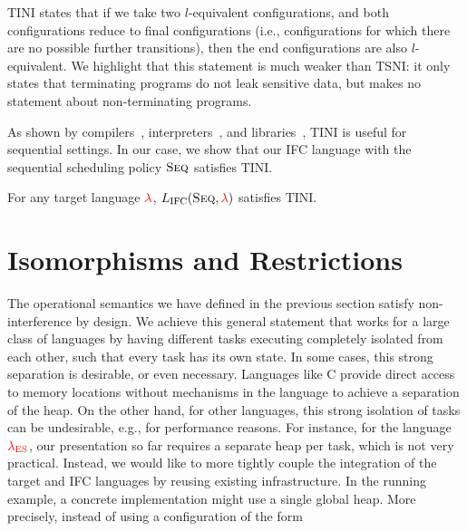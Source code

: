 \documentclass{llncs}
\newcommand{\Red}[1]{{\color{red} #1}}
\begin{document}
TINI states that if we take two \ensuremath{l}-equivalent configurations, and both
configurations reduce to final configurations (i.e.,
configurations for which there are no
possible further transitions), then the end configurations are also
\ensuremath{l}-equivalent.
We highlight that this statement is much weaker than TSNI: it only states that
terminating programs do not leak sensitive data, but makes no statement
about non-terminating programs.

As shown by compilers~\cite{jif,FlowCaml}, interpreters~\cite{JSFlow}, and
libraries~\cite{Russo+:Haskell08,lio}, TINI is useful for sequential
settings. In our case, we show that our IFC language with the sequential scheduling policy
\ensuremath{\textsc{Seq}} satisfies TINI.
\begin{theorem}
  \label{thm:seq-tini}
For any target language \ensuremath{\Red{\lambda}}, \ensuremath{L_\text{IFC}(\textsc{Seq},\Red{\lambda})} satisfies TINI.
\end{theorem}



\section{Isomorphisms and Restrictions}
\label{sec:concrete}

\newcommand{\con}[1]{\ensuremath{{\color{red} #1}}}
\newcommand{\abs}[1]{\ensuremath{{\color{blue} #1}}}

The operational semantics we have defined in the previous section
satisfy non-interference by design.
We achieve this general statement that works for a large class of
languages by having different tasks executing completely isolated from
each other, such that every task has its own state.
In some cases, this strong separation is desirable, or even necessary.
Languages like C provide direct access to memory locations without
mechanisms in the language to achieve a separation of the heap.
On the other hand, for other languages, this
strong isolation of tasks can be
undesirable, e.g., for performance reasons.
For instance, for the language \ensuremath{\Red{\lambda_{\text{ES}}}}, our presentation so far
requires a separate heap per task, which is not very practical.
Instead, we would like to
more tightly couple the integration of the target and IFC
languages by reusing existing infrastructure.  In the running example,
a concrete implementation might use a single global heap.
More precisely, instead of using a configuration of the form
\end{document}
